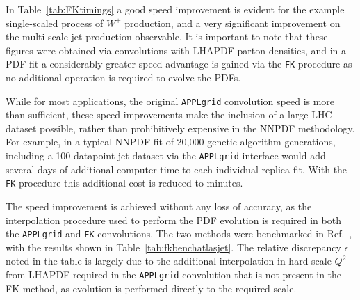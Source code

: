 In Table~\ref{tab:FKtimings} a good speed improvement is evident for the example single-scaled process of $W^+$ production, and a very significant improvement on the multi-scale jet production observable. It is important to note that these figures were obtained via convolutions with LHAPDF parton densities, and in a PDF fit a considerably greater speed advantage is gained via the {\tt FK} procedure as no additional operation is required to evolve the PDFs.

While for most applications, the original { \tt APPLgrid} convolution speed is more than sufficient, these speed improvements make the inclusion of a large LHC dataset possible, rather than prohibitively expensive in the NNPDF methodology. For example, in a typical NNPDF fit of 20,000 genetic algorithm generations, including a 100 datapoint jet dataset via the { \tt APPLgrid} interface would add several days of additional computer time to each individual replica fit. With the {\tt FK} procedure this additional cost is reduced to minutes.

The speed improvement is achieved without any loss of accuracy, as the interpolation procedure used to perform the PDF evolution is required in both the { \tt APPLgrid} and {\tt FK} convolutions. The two methods were benchmarked in Ref.~\cite{Ball:2012cx}, with the results shown in Table~\ref{tab:fkbenchatlasjet}. The relative discrepancy $\epsilon$ noted in the table is largely due to the additional interpolation in hard scale $Q^2$ from LHAPDF required in the { \tt APPLgrid} convolution that is not present in the {\tt} FK method, as evolution is performed directly to the required scale.

